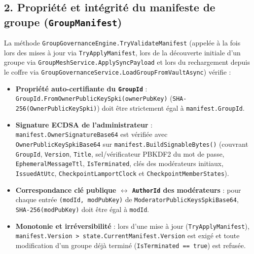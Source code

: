 \documentclass[11pt,a4paper]{article}
\begin{document}
\subsection{2. Propriété et intégrité du manifeste de groupe (\texttt{GroupManifest})}
La méthode \texttt{GroupGovernanceEngine.TryValidateManifest} (appelée à la fois lors des mises à jour via \texttt{TryApplyManifest}, lors de la découverte initiale d'un groupe via \texttt{GroupMeshService.ApplySyncPayload} et lors du rechargement depuis le coffre via \texttt{GroupGovernanceService.LoadGroupFromVaultAsync}) vérifie :
\begin{itemize}
    \item \textbf{Propriété auto-certifiante du \texttt{GroupId}} : \texttt{GroupId.FromOwnerPublicKeySpki(ownerPubKey)} (\texttt{SHA-256(OwnerPublicKeySpki)}) doit être strictement égal à \texttt{manifest.GroupId}.
    \item \textbf{Signature ECDSA de l'administrateur} : \texttt{manifest.OwnerSignatureBase64} est vérifiée avec \texttt{OwnerPublicKeySpkiBase64} sur \texttt{manifest.BuildSignableBytes()} (couvrant \texttt{GroupId}, \texttt{Version}, \texttt{Title}, sel/vérificateur PBKDF2 du mot de passe, \texttt{EphemeralMessageTtl}, \texttt{IsTerminated}, clés des modérateurs initiaux, \texttt{IssuedAtUtc}, \texttt{CheckpointLamportClock} et \texttt{CheckpointMemberStates}).
    \item \textbf{Correspondance clé publique $\leftrightarrow$ \texttt{AuthorId} des modérateurs} : pour chaque entrée \texttt{(modId, modPubKey)} de \texttt{ModeratorPublicKeysSpkiBase64}, \texttt{SHA-256(modPubKey)} doit être égal à \texttt{modId}.
    \item \textbf{Monotonie et irréversibilité} : lors d'une mise à jour (\texttt{TryApplyManifest}), \texttt{manifest.Version > state.CurrentManifest.Version} est exigé et toute modification d'un groupe déjà terminé (\texttt{IsTerminated == true}) est refusée.
\end{itemize}
\end{document}
